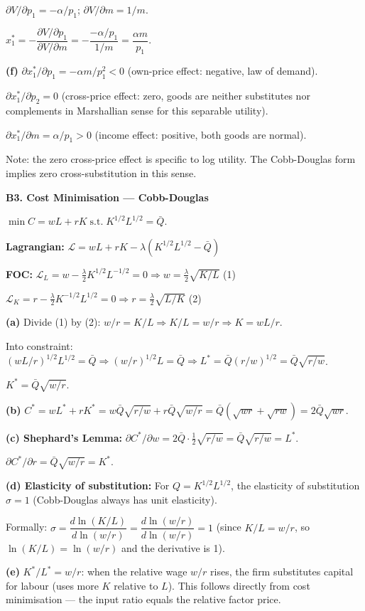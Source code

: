 \documentclass[12pt, a4paper]{article}
\theoremstyle{definition}
\newcommand{\st}{\;\text{s.t.}\;}
\begin{document}
\begin{solbox}
$\partial V/\partial p_1 = -\alpha/p_1$;\quad
$\partial V/\partial m = 1/m$.

$x_1^* = -\dfrac{\partial V/\partial p_1}{\partial V/\partial m}
= -\dfrac{-\alpha/p_1}{1/m} = \dfrac{\alpha m}{p_1}$. \checkmark

\textbf{(f)} 
$\partial x_1^*/\partial p_1 = -\alpha m/p_1^2 < 0$ (own-price effect: negative, law of demand).

$\partial x_1^*/\partial p_2 = 0$ (cross-price effect: zero, goods are neither substitutes nor complements in Marshallian sense for this separable utility).

$\partial x_1^*/\partial m = \alpha/p_1 > 0$ (income effect: positive, both goods are normal).

Note: the zero cross-price effect is specific to log utility. The Cobb-Douglas form implies zero cross-substitution in this sense.
\end{solbox}

\begin{solbox}
\textbf{B3. Cost Minimisation --- Cobb-Douglas}

$\min C=wL+rK \st K^{1/2}L^{1/2}=\bar Q$.

\textbf{Lagrangian:}
$\mathcal{L}=wL+rK-\lambda(K^{1/2}L^{1/2}-\bar Q)$

\textbf{FOC:}
$\mathcal{L}_L = w-\frac{\lambda}{2}K^{1/2}L^{-1/2}=0 \Rightarrow w=\frac{\lambda}{2}\sqrt{K/L}$ \quad (1)

$\mathcal{L}_K = r-\frac{\lambda}{2}K^{-1/2}L^{1/2}=0 \Rightarrow r=\frac{\lambda}{2}\sqrt{L/K}$ \quad (2)

\textbf{(a)} Divide (1) by (2): $w/r = K/L \Rightarrow K/L = w/r \Rightarrow K=wL/r$.

Into constraint: $(wL/r)^{1/2}L^{1/2}=\bar Q \Rightarrow (w/r)^{1/2}L=\bar Q
\Rightarrow L^* = \bar Q(r/w)^{1/2} = \bar Q\sqrt{r/w}$.

$K^* = \bar Q\sqrt{w/r}$.

\textbf{(b)} $C^* = wL^*+rK^* = w\bar Q\sqrt{r/w}+r\bar Q\sqrt{w/r}
= \bar Q(\sqrt{wr}+\sqrt{rw}) = 2\bar Q\sqrt{wr}$.

\textbf{(c) Shephard's Lemma:}
$\partial C^*/\partial w = 2\bar Q\cdot\frac{1}{2}\sqrt{r/w} = \bar Q\sqrt{r/w} = L^*$. \checkmark

$\partial C^*/\partial r = \bar Q\sqrt{w/r} = K^*$. \checkmark

\textbf{(d) Elasticity of substitution:}
For $Q=K^{1/2}L^{1/2}$, the elasticity of substitution $\sigma=1$ (Cobb-Douglas always has unit elasticity).

Formally: $\sigma = \dfrac{d\ln(K/L)}{d\ln(w/r)} = \dfrac{d\ln(w/r)}{d\ln(w/r)} = 1$
(since $K/L = w/r$, so $\ln(K/L)=\ln(w/r)$ and the derivative is 1).

\textbf{(e)} $K^*/L^* = w/r$: when the relative wage $w/r$ rises, the firm substitutes capital for labour (uses more $K$ relative to $L$). This follows directly from cost minimisation --- the input ratio equals the relative factor price.
\end{solbox}
\end{document}
